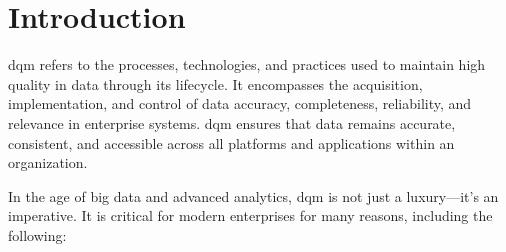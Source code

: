 \chapter*{Introduction}

\acrfull{dqm} refers to the processes, technologies, and practices used to maintain high quality in data through its lifecycle. It encompasses the acquisition, implementation, and control of data accuracy, completeness, reliability, and relevance in enterprise systems. \acrshort{dqm} ensures that data remains accurate, consistent, and accessible across all platforms and applications within an organization.

In the age of big data and advanced analytics, \acrshort{dqm} is not just a luxury—it's an imperative. It is critical for modern enterprises for many reasons, including the following:

